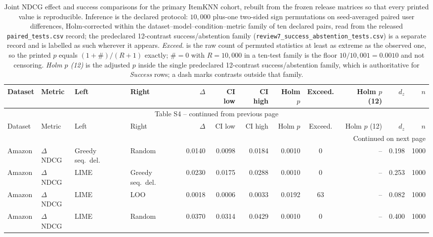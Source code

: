 \begin{longtable}{@{}p{}p{}p{}p{}rrrrcrrr@{}}
\caption{Joint NDCG effect and success comparisons for the primary ItemKNN
cohort, rebuilt from the frozen release matrices so that every printed value is
reproducible. Inference is the declared protocol: $10{,}000$ plus-one two-sided
sign permutations on seed-averaged paired user differences, Holm-corrected
within the dataset--model--condition--metric family of ten declared pairs, read from the
released \texttt{paired\_tests.csv} record; the predeclared 12-contrast success/abstention
family (\texttt{review7\_success\_abstention\_tests.csv}) is a separate record and is labelled as such wherever it appears.
\emph{Exceed.} is the raw count of permuted statistics at least as extreme as
the observed one, so the printed $p$ equals $(1+\#)/(R+1)$ exactly; $\#=0$
with $R=10{,}000$ in a ten-test family is the floor $10/10{,}001=0.0010$ and
not censoring. \emph{Holm $p$ (12)} is the adjusted $p$ inside the single
predeclared 12-contrast success/abstention family, which is authoritative for
\emph{Success} rows; a dash marks contrasts outside that family.}
\label{tab:S4}\\
\toprule
Dataset & Metric & Left & Right & $\Delta$ & CI low & CI high & Holm $p$ & Exceed. & Holm $p$ (12) & $d_z$ & $n$ \\
\midrule
\endfirsthead
\multicolumn{12}{c}{Table S4 -- continued from previous page}\\
\toprule
Dataset & Metric & Left & Right & $\Delta$ & CI low & CI high & Holm $p$ & Exceed. & Holm $p$ (12) & $d_z$ & $n$ \\
\midrule
\endhead
\midrule
\multicolumn{12}{r}{Continued on next page}\\
\endfoot
\bottomrule
\endlastfoot
Amazon & $\Delta$NDCG & Greedy seq.\ del. & Random & 0.0140 & 0.0098 & 0.0184 & 0.0010 & 0 & -- & 0.198 & 1000 \\
Amazon & $\Delta$NDCG & LIME & Greedy seq.\ del. & 0.0230 & 0.0175 & 0.0288 & 0.0010 & 0 & -- & 0.253 & 1000 \\
Amazon & $\Delta$NDCG & LIME & LOO & 0.0018 & 0.0006 & 0.0033 & 0.0192 & 63 & -- & 0.082 & 1000 \\
Amazon & $\Delta$NDCG & LIME & Random & 0.0370 & 0.0314 & 0.0429 & 0.0010 & 0 & -- & 0.400 & 1000 \\

\end{longtable}
